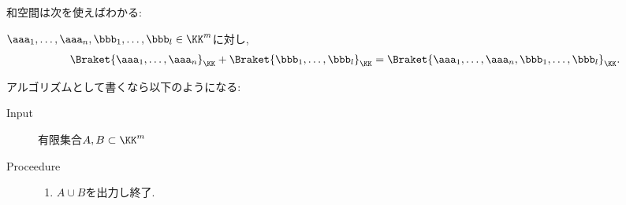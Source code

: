 和空間は次を使えばわかる:
\begin{prop}
  $\aaa_1,\ldots,\aaa_n,\bbb_1,\ldots,\bbb_l\in\KK^m$に対し,
  \begin{align*}
    \Braket{\aaa_1,\ldots,\aaa_n}_{\KK}+\Braket{\bbb_1,\ldots,\bbb_l}_{\KK}
    =
    \Braket{\aaa_1,\ldots,\aaa_n,\bbb_1,\ldots,\bbb_l}_{\KK}.
  \end{align*}
\end{prop}
アルゴリズムとして書くなら以下のようになる:
\begin{algorithm}\makebox{}
\begin{description}
\item[Input]
  有限集合$A,B\subset \KK^m$
\item[Proceedure]\makebox{}
  \begin{enumerate}
    \item $A\cup B$を出力し終了.
  \end{enumerate}
\end{description}
\end{algorithm}

